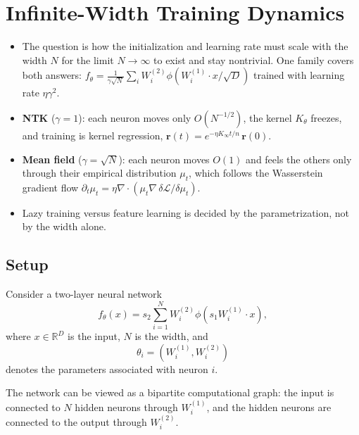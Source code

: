 \chapter{Infinite-Width Training Dynamics}
\label{ch:lecture3}

\begin{keyideas}
\begin{itemize}
    \item The question is how the initialization and learning rate must
    scale with the width $N$ for the limit $N\to\infty$ to exist and stay
    nontrivial. One family covers both answers:
    $f_\theta=\frac{1}{\gamma\sqrt N}\sum_i W^{(2)}_i\phi(W^{(1)}_i\cdot x/\sqrt D)$
    trained with learning rate $\eta\gamma^2$.
    \item \textbf{NTK} ($\gamma=1$): each neuron moves only $O(N^{-1/2})$,
    the kernel $K_\theta$ freezes, and training is kernel regression,
    $\mathbf r(t)=e^{-\eta K_\infty t/n}\,\mathbf r(0)$.
    \item \textbf{Mean field} ($\gamma=\sqrt N$): each neuron moves $O(1)$
    and feels the others only through their empirical distribution $\mu_t$,
    which follows the Wasserstein gradient flow
    $\partial_t\mu_t=\eta\nabla\cdot(\mu_t\nabla\,\delta\mathcal L/\delta\mu_t)$.
    \item Lazy training versus feature learning is decided by the
    parametrization, not by the width alone.
\end{itemize}
\end{keyideas}

\section{Setup}

Consider a two-layer neural network
\begin{equation}
    f_\theta(x)
    =
    s_2
    \sum_{i=1}^{N}
    W_i^{(2)}
    \phi\!\left(
        s_1 W_i^{(1)}\cdot x
    \right),
\end{equation}
where \(x\in\mathbb{R}^D\) is the input, \(N\) is the width, and
\[
\theta_i
=
\left(
W_i^{(1)},W_i^{(2)}
\right)
\]
denotes the parameters associated with neuron \(i\).

The network can be viewed as a bipartite computational graph:
the input is connected to \(N\) hidden neurons through \(W_i^{(1)}\),
and the hidden neurons are connected to the output through \(W_i^{(2)}\).

